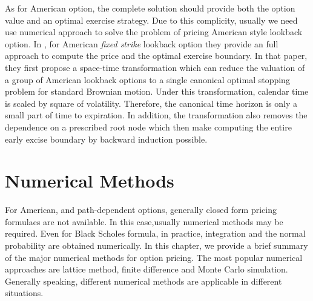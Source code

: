 \documentclass[12pt,oneside,titlepage]{book}
\begin{document}
As for American option, the complete solution should provide both the option value and an optimal exercise strategy. Due to this complicity, usually we need use numerical approach to solve the problem of pricing American style lookback option. In \cite{Lim2004}, for American \emph {fixed strike} lookback option they provide an full approach to compute the price and the optimal exercise boundary. In that paper, they first propose a space-time transformation which can reduce the valuation of a group of American lookback options to a single canonical optimal stopping problem for standard Brownian motion. Under this transformation, calendar time is scaled by square of volatility. Therefore, the canonical time horizon is only a small part of time to expiration. In addition, the transformation also removes the dependence on a prescribed root node which then make computing the entire early excise boundary by backward induction possible.


\chapter{Numerical Methods}

For American, and path-dependent options, generally closed form pricing formulaes are not available. In this case,usually numerical methods may be required. Even for Black Scholes formula, in practice, integration and the normal probability are obtained numerically. In this chapter, we provide a brief summary of the major numerical methods for option pricing. The most popular numerical approaches are lattice method, finite difference and Monte Carlo simulation. Generally speaking, different numerical methods are applicable in different situations. 
\end{document}
